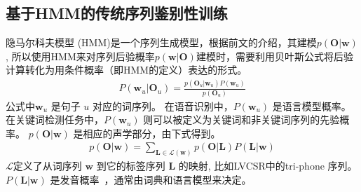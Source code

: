 %

\subsection{基于HMM的传统序列鉴别性训练}
\label{Sec:sgm-sdt-intro}

隐马尔科夫模型 (HMM)是一个序列生成模型，根据前文的介绍，其建模$p(\mathbf{O}|\mathbf{w})$, 所以使用HMM来对序列后验概率$p(\mathbf{w}|\mathbf{O})$建模时，需要利用贝叶斯公式将后验计算转化为用条件概率（即HMM的定义）表达的形式。
\begin{equation}
\label{equ:map-dec}
\begin{split}
P(\mathbf{w}_u|\mathbf{O}_u)=\frac {p(\mathbf{O}_u|\mathbf{w}_u)P(\mathbf{w}_u)}{p(\mathbf{O}_u)}  
\end{split}
\end{equation}
公式中$\mathbf{w}_u$ 是句子 $u$ 对应的词序列。 在语音识别中，$P(\mathbf{w}_u)$ 是语言模型概率。在关键词检测任务中，$P(\mathbf{w}_u)$ 则可以被定义为关键词和非关键词序列的先验概率。
$p(\mathbf{O}|\mathbf{w})$ 是相应的声学部分，由下式得到。
\begin{equation}
\label{equ:lexicon}
\begin{split}
p(\mathbf{O}|\mathbf{w})=\sum_{\mathbf{L}\in\mathcal{L}(\mathbf{w})} p(\mathbf{O}|\mathbf{L})P(\mathbf{L}|\mathbf{w})
\end{split}
\end{equation}
$\mathcal{L}$定义了从词序列 $\mathbf{w}$ 到它的标签序列 $\mathbf{L}$ 的映射, 比如LVCSR中的tri-phone 序列。 $P(\mathbf{L}|\mathbf{w})$ 是发音概率~\cite{chen2015pronunciation}，通常由词典和语言模型来决定。

